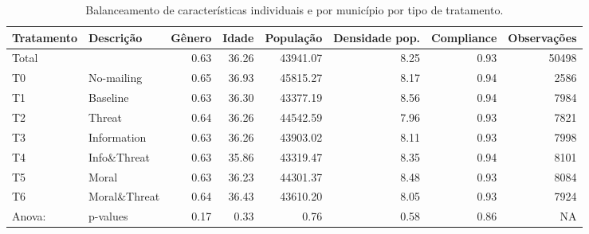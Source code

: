 \begin{table}[H]

\caption{\label{tab:tab1}Balanceamento de características individuais e por município por tipo de tratamento.}
\centering
\fontsize{8}{10}\selectfont
\begin{tabular}[t]{llrrrrrr}
\toprule
Tratamento & Descrição & Gênero & Idade & População & Densidade pop. & Compliance & Observações\\
\midrule
Total &  & 0.63 & 36.26 & 43941.07 & 8.25 & 0.93 & 50498\\
T0 & No-mailing & 0.65 & 36.93 & 45815.27 & 8.17 & 0.94 & 2586\\
T1 & Baseline & 0.63 & 36.30 & 43377.19 & 8.56 & 0.94 & 7984\\
T2 & Threat & 0.64 & 36.26 & 44542.59 & 7.96 & 0.93 & 7821\\
T3 & Information & 0.63 & 36.26 & 43903.02 & 8.11 & 0.93 & 7998\\
\addlinespace
T4 & Info\&Threat & 0.63 & 35.86 & 43319.47 & 8.35 & 0.94 & 8101\\
T5 & Moral & 0.63 & 36.23 & 44301.37 & 8.48 & 0.93 & 8084\\
T6 & Moral\&Threat & 0.64 & 36.43 & 43610.20 & 8.05 & 0.93 & 7924\\
Anova: & p-values & 0.17 & 0.33 & 0.76 & 0.58 & 0.86 & NA\\
\bottomrule
\end{tabular}
\end{table}
